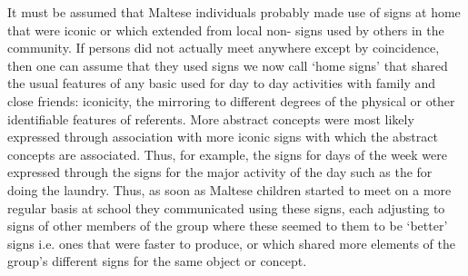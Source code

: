 \documentclass[output=paper]{langsci/langscibook}
\begin{document}
It must be assumed that Maltese  individuals probably made use of
signs at home that were iconic or which extended from local non-
signs used by others in the community.  If  persons did not
actually meet anywhere except by coincidence, then one can assume that
they used signs we now call ‘home signs’ that shared the usual
features of any basic  used for day to day activities
with family and close friends: iconicity, the mirroring to different
degrees of the physical or other identifiable features of
referents. More abstract concepts were most likely expressed through
association with more iconic signs with which the abstract concepts
are associated. Thus, for example, the signs for days of the week were
expressed through the signs for the major activity of the day such as
the  for doing the laundry. Thus, as soon as Maltese  children
started to meet on a more regular basis at school they communicated
using these signs, each adjusting to signs of other members of the
group where these seemed to them to be ‘better’ signs i.e. ones that
were faster to produce, or which shared more elements of the group’s
different signs for the same object or concept.
\end{document}
